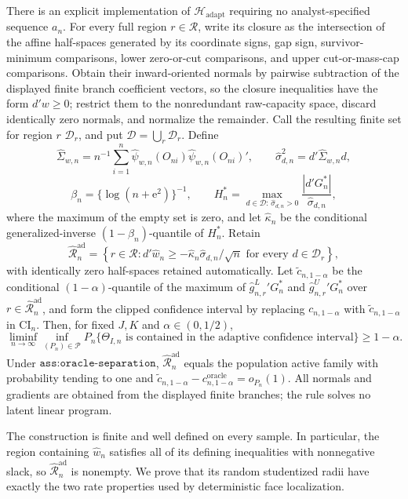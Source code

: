 There is an explicit implementation of \(\mathcal H_{\mathrm{adapt}}\) requiring no analyst-specified sequence \(a_n\). For every full region \(r\in\mathcal R\), write its closure as the intersection of the affine half-spaces generated by its coordinate signs, gap sign, survivor-minimum comparisons, lower zero-or-cut comparisons, and upper cut-or-mass-cap comparisons. Obtain their inward-oriented normals by pairwise subtraction of the displayed finite branch coefficient vectors, so the closure inequalities have the form \(d'w\ge0\); restrict them to the nonredundant raw-capacity space, discard identically zero normals, and normalize the remainder. Call the resulting finite set for region \(r\) \(\mathcal D_r\), and put \(\mathcal D=\bigcup_r\mathcal D_r\). Define
\[
 \widehat\Sigma_{w,n}=n^{-1}\sum_{i=1}^n
 \widehat\psi_{w,n}(O_{ni})\widehat\psi_{w,n}(O_{ni})',
 \qquad
 \widehat\sigma_{d,n}^2=d'\widehat\Sigma_{w,n}d,
\]
\[
 \beta_n=\{\log(n+\mathrm e^2)\}^{-1},\qquad
 H_n^*=\max_{d\in\mathcal D:\,\widehat\sigma_{d,n}>0}
 \frac{|d'G_n^*|}{\widehat\sigma_{d,n}},
\]
where the maximum of the empty set is zero, and let \(\widehat\kappa_n\) be the conditional generalized-inverse \((1-\beta_n)\)-quantile of \(H_n^*\). Retain
\[
 \widehat{\mathcal R}_n^{\mathrm{ad}}
 =\left\{r\in\mathcal R:
 d'\widehat w_n\ge-\widehat\kappa_n\widehat\sigma_{d,n}/\sqrt n
 \text{ for every }d\in\mathcal D_r\right\},
\]
with identically zero half-spaces retained automatically. Let \(\widetilde c_{n,1-\alpha}\) be the conditional \((1-\alpha)\)-quantile of the maximum of
\(\widehat g^L_{n,r}{}'G_n^*\) and \(\widehat g^U_{n,r}{}'G_n^*\) over \(r\in\widehat{\mathcal R}_n^{\mathrm{ad}}\), and form the clipped confidence interval by replacing \(c_{n,1-\alpha}\) with \(\widetilde c_{n,1-\alpha}\) in \(\mathrm{CI}_n\). Then, for fixed \(J,K\) and \(\alpha\in(0,1/2)\),
\[
 \liminf_{n\to\infty}\inf_{(P_n)\in\mathcal P}
 P_n\{\Theta_{I,n}\text{ is contained in the adaptive confidence interval}\}
 \ge1-\alpha.
\]
Under \(\texttt{ass:oracle-separation}\), \(\widehat{\mathcal R}_n^{\mathrm{ad}}\) equals the population active family with probability tending to one and
\(\widetilde c_{n,1-\alpha}-c^{\mathrm{oracle}}_{n,1-\alpha}=o_{P_n}(1)\). All normals and gradients are obtained from the displayed finite branches; the rule solves no latent linear program.

The construction is finite and well defined on every sample. In particular, the region containing \(\widehat w_n\) satisfies all of its defining inequalities with nonnegative slack, so \(\widehat{\mathcal R}_n^{\mathrm{ad}}\) is nonempty. We prove that its random studentized radii have exactly the two rate properties used by deterministic face localization.

